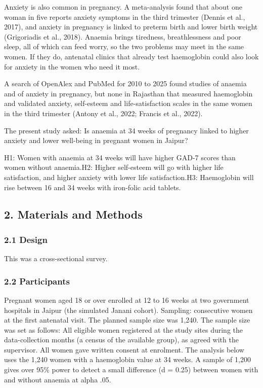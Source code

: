 \documentclass[12pt]{article}
\begin{document}
Anxiety is also common in pregnancy. A meta-analysis found that about one woman in five reports anxiety symptoms in the third trimester (Dennis et al., 2017), and anxiety in pregnancy is linked to preterm birth and lower birth weight (Grigoriadis et al., 2018). Anaemia brings tiredness, breathlessness and poor sleep, all of which can feed worry, so the two problems may meet in the same women. If they do, antenatal clinics that already test haemoglobin could also look for anxiety in the women who need it most.

A search of OpenAlex and PubMed for 2010 to 2025 found studies of anaemia and of anxiety in pregnancy, but none in Rajasthan that measured haemoglobin and validated anxiety, self-esteem and life-satisfaction scales in the same women in the third trimester (Antony et al., 2022; Francis et al., 2022).

The present study asked: Is anaemia at 34 weeks of pregnancy linked to higher anxiety and lower well-being in pregnant women in Jaipur?

H1: Women with anaemia at 34 weeks will have higher GAD-7 scores than women without anaemia.\newline{}H2: Higher self-esteem will go with higher life satisfaction, and higher anxiety with lower life satisfaction.\newline{}H3: Haemoglobin will rise between 16 and 34 weeks with iron-folic acid tablets.

\subsection{2. Materials and Methods}

\subsubsection{2.1 Design}

This was a cross-sectional survey.

\subsubsection{2.2 Participants}

Pregnant women aged 18 or over enrolled at 12 to 16 weeks at two government hospitals in Jaipur (the simulated Janani cohort). Sampling: consecutive women at the first antenatal visit. The planned sample size was 1,240. The sample size was set as follows: All eligible women registered at the study sites during the data-collection months (a census of the available group), as agreed with the supervisor. All women gave written consent at enrolment. The analysis below uses the 1,240 women with a haemoglobin value at 34 weeks. A sample of 1,200 gives over 95\% power to detect a small difference (d = 0.25) between women with and without anaemia at alpha .05.
\end{document}
